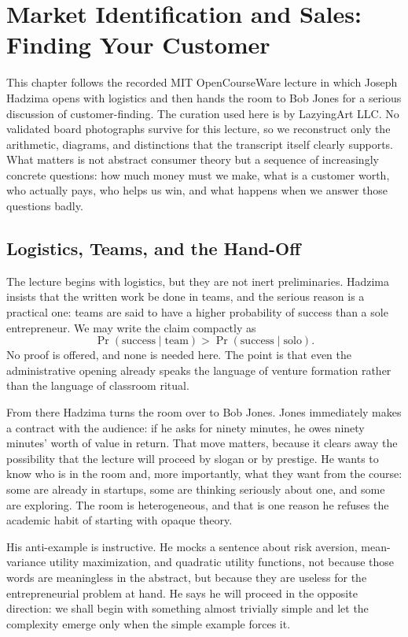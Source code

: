 \chapter{Market Identification and Sales: Finding Your Customer}

This chapter follows the recorded MIT OpenCourseWare lecture in which Joseph Hadzima opens with logistics and then hands the room to Bob Jones for a serious discussion of customer-finding. The curation used here is by LazyingArt LLC. No validated board photographs survive for this lecture, so we reconstruct only the arithmetic, diagrams, and distinctions that the transcript itself clearly supports. What matters is not abstract consumer theory but a sequence of increasingly concrete questions: how much money must we make, what is a customer worth, who actually pays, who helps us win, and what happens when we answer those questions badly.

\section{Logistics, Teams, and the Hand-Off}

The lecture begins with logistics, but they are not inert preliminaries. Hadzima insists that the written work be done in teams, and the serious reason is a practical one: teams are said to have a higher probability of success than a sole entrepreneur. We may write the claim compactly as
\begin{equation}
\Pr(\text{success}\mid \text{team})>\Pr(\text{success}\mid \text{solo}).
\end{equation}
No proof is offered, and none is needed here. The point is that even the administrative opening already speaks the language of venture formation rather than the language of classroom ritual.

From there Hadzima turns the room over to Bob Jones. Jones immediately makes a contract with the audience: if he asks for ninety minutes, he owes ninety minutes' worth of value in return. That move matters, because it clears away the possibility that the lecture will proceed by slogan or by prestige. He wants to know who is in the room and, more importantly, what they want from the course: some are already in startups, some are thinking seriously about one, and some are exploring. The room is heterogeneous, and that is one reason he refuses the academic habit of starting with opaque theory.

His anti-example is instructive. He mocks a sentence about risk aversion, mean-variance utility maximization, and quadratic utility functions, not because those words are meaningless in the abstract, but because they are useless for the entrepreneurial problem at hand. He says he will proceed in the opposite direction: we shall begin with something almost trivially simple and let the complexity emerge only when the simple example forces it.

